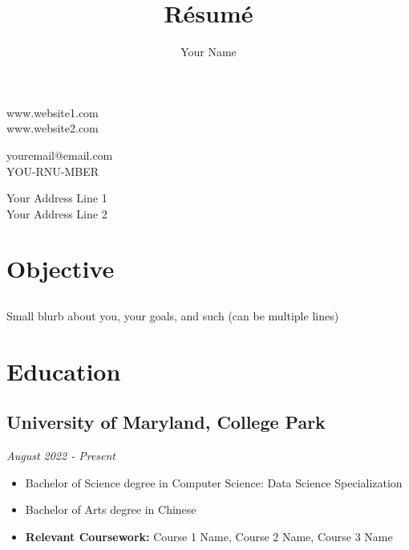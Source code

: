\documentclass{article}
\renewcommand{\maketitle}[6]{
    \begin{center}
        {\LARGE\bfseries\theauthor}
    \end{center}

    \vspace{-20pt}

    \begin{multicols}{3}
        \begin{flushleft}
            #1 \\
            #2
        \end{flushleft}

        \begin{center}
            #3 \\
            #4
        \end{center}

        \begin{flushright}
            #5 \\
            #6
        \end{flushright}
    \end{multicols}
}
\renewcommand{\date}[1]{
    \hfill{\normalsize\textit{#1}}
}
\begin{document}
    \title{R\'esum\'e}
    \author{Your Name}

    \maketitle{
        www.website1.com
    }{
        www.website2.com
    }{
        youremail@email.com
    }{
        YOU-RNU-MBER
    }{
        Your Address Line 1
    }{
        Your Address Line 2
    }

    \section{Objective}
        \subsection{}
            Small blurb about you, your goals, and such (can be multiple lines)

    \section{Education}

        \subsection{University of Maryland, College Park}\date{August 2022 - Present}
            \begin{itemize}
                \item Bachelor of Science degree in Computer Science: Data Science Specialization
                \item Bachelor of Arts degree in Chinese
                \item {\bfseries Relevant Coursework: }{Course 1 Name, Course 2 Name, Course 3 Name}
            \end{itemize}
\end{document}
